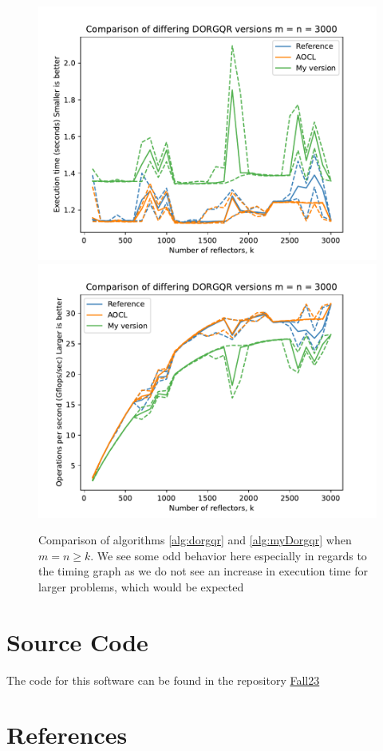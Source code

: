 \documentclass[12pt]{article}
\begin{document}
    \begin{figure}
        \centering
            \includegraphics[width=.45\textwidth]{figures/timeDORGQRSquare.pdf}
            \includegraphics[width=.45\textwidth]{figures/flopDORGQRSquare.pdf}
        \caption{Comparison of algorithms \ref{alg:dorgqr} and \ref{alg:myDorgqr} when $m=n\geq k$. 
        We see some odd behavior here especially in regards to the timing graph as we do not see an increase 
        in execution time for larger problems, which would be expected}\label{fig:dorgqrSquare}
    \end{figure}
    \section{Source Code}
    The code for this software can be found in the repository \href{https://github.com/jprhyne/Fall23}{Fall23}
    \section{References}
    
    
\end{document}
